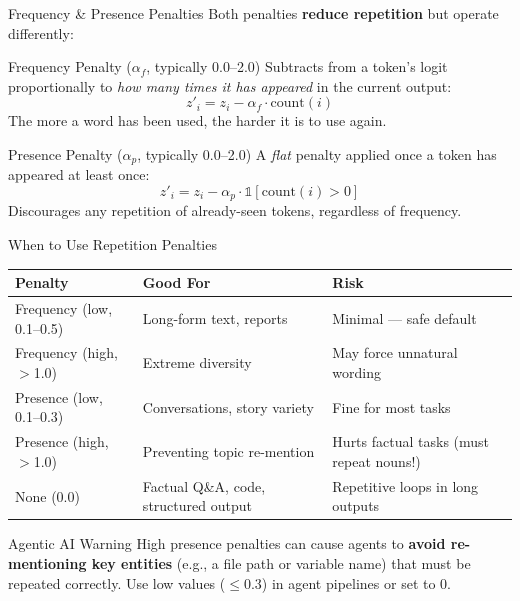 \documentclass{beamer}
\begin{document}
\begin{frame}{Frequency \& Presence Penalties}
    Both penalties \textbf{reduce repetition} but operate differently:

    \vspace{0.2cm}
    \begin{block}{Frequency Penalty ($\alpha_f$, typically 0.0--2.0)}
        Subtracts from a token's logit proportionally to \emph{how many times it has appeared} in the
        current output:
        \[
            z'_i = z_i - \alpha_f \cdot \text{count}(i)
        \]
        The more a word has been used, the harder it is to use again.
    \end{block}

    \begin{block}{Presence Penalty ($\alpha_p$, typically 0.0--2.0)}
        A \emph{flat} penalty applied once a token has appeared at least once:
        \[
            z'_i = z_i - \alpha_p \cdot \mathbb{1}[\text{count}(i) > 0]
        \]
        Discourages any repetition of already-seen tokens, regardless of frequency.
    \end{block}
\end{frame}

\begin{frame}{When to Use Repetition Penalties}
    \begin{table}
        \centering
        \small
        \begin{tabular}{@{}lll@{}}
            \toprule
            \textbf{Penalty} & \textbf{Good For} & \textbf{Risk} \\ \midrule
            Frequency (low, 0.1--0.5) & Long-form text, reports       & Minimal --- safe default   \\
            Frequency (high, $>$1.0)  & Extreme diversity             & May force unnatural wording \\
            Presence (low, 0.1--0.3)  & Conversations, story variety  & Fine for most tasks         \\
            Presence (high, $>$1.0)   & Preventing topic re-mention   & Hurts factual tasks (must repeat nouns!) \\
            None (0.0)                & Factual Q\&A, code, structured output & Repetitive loops in long outputs \\ \bottomrule
        \end{tabular}
    \end{table}

    \begin{alertblock}{Agentic AI Warning}
        High presence penalties can cause agents to \textbf{avoid re-mentioning key entities}
        (e.g., a file path or variable name) that must be repeated correctly.
        Use low values ($\leq 0.3$) in agent pipelines or set to 0.
    \end{alertblock}
\end{frame}
\end{document}
